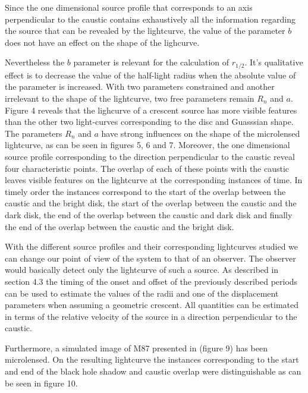 Since the one dimensional source profile that corresponds to an axis perpendicular to the caustic contains exhaustively all the information regarding the source that can be revealed by the lightcurve, 
the value of the parameter $b$ does not have an effect on the shape of the lighcurve. 

Nevertheless the $b$ parameter is relevant for the calculation of $r_{1/2}$. 
It's qualitative effect is to decrease the value of the half-light radius when the absolute value of the parameter is increased.  
With two parameters constrained and another irrelevant to the shape of the lightcurve, two free parameters remain $R_n$ and $a$. 
Figure 4 reveals that the lighcurve of a crescent source has more visible features than the other two light-curves 
corresponding to the disc and Guasssian shape. The parameters $R_n$ and $a$ have strong influences on the shape of 
the microlensed lightcurve, as can be seen in figures 5, 6 and 7. Moreover, the one dimensional source profile corresponding to the direction perpendicular to the caustic reveal four characteristic points. The overlap of each of these points with the caustic leaves visible features on the lightcurve at the corresponding instances of time. In timely order the instances correspond to the start of the overlap between the caustic and the bright disk, the start of the overlap between the caustic and the dark disk, the end of the overlap between the caustic and dark disk and finally the end of the overlap between the caustic and the bright disk.          


With the different source profiles and their corresponding lightcurves studied we can change our point of view of the system to that of an observer. 
The observer would basically detect only the lightcurve of such a source. As described in section 4.3 the timing of the onset and offset of the previously 
described periods can be used to estimate the values of the radii and one of the displacement parameters when assuming a geometric crescent. 
All quantities can be estimated in terms of the relative velocity of the source in a direction perpendicular to the caustic.


Furthermore, a simulated image of M87 presented in \citep{2012MNRAS.421.1517D} (figure 9) has been microlensed. On the resulting lightcurve the instances 
corresponding to the start and end of the black hole shadow and caustic overlap were distinguishable as can be seen in figure 10.
    

